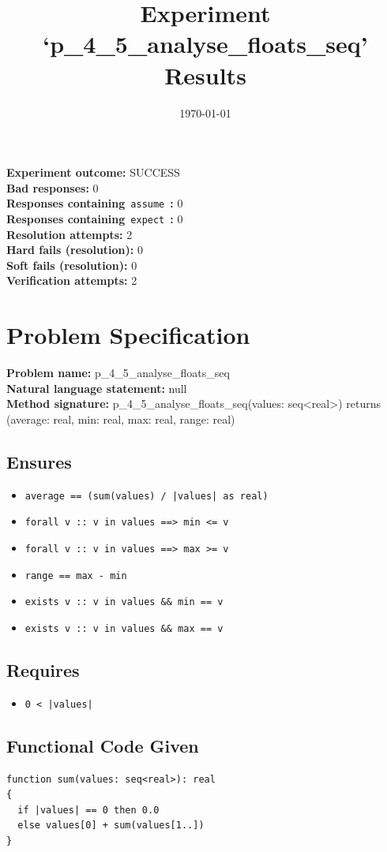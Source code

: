 \documentclass{article}
\begin{document}
\title{Experiment `p\_4\_5\_analyse\_floats\_seq' Results}
\author{\today}
\date{}
\maketitle
\textbf{Experiment outcome: }SUCCESS
\\\textbf{Bad responses: }0
\\\textbf{Responses containing}~\texttt{assume}~\textbf{: }0
\\\textbf{Responses containing}~\texttt{expect}~\textbf{: }0
\\\textbf{Resolution attempts: }2
\\\textbf{Hard fails (resolution): }0
\\\textbf{Soft fails (resolution): }0
\\\textbf{Verification attempts: }2
\section*{Problem Specification}
\textbf{Problem name: }p\_4\_5\_analyse\_floats\_seq
\\\textbf{Natural language statement: }null
\\\textbf{Method signature: }p\_4\_5\_analyse\_floats\_seq(values: seq<real>) returns (average: real, min: real, max: real, range: real)
\subsection*{Ensures}
\begin{itemize}
\item \texttt{average == (sum(values) / |values| as real)}
\item \texttt{forall v :: v in values ==> min <= v}
\item \texttt{forall v :: v in values ==> max >= v}
\item \texttt{range == max - min}
\item \texttt{exists v :: v in values \&\& min == v}
\item \texttt{exists v :: v in values \&\& max == v}
\end{itemize}
\subsection*{Requires}
\begin{itemize}
\item \texttt{0 < |values|}
\end{itemize}
\subsection*{Functional Code Given}
\begin{lstlisting}
function sum(values: seq<real>): real
{
  if |values| == 0 then 0.0
  else values[0] + sum(values[1..])
}
\end{lstlisting}
\clearpage
\end{document}

